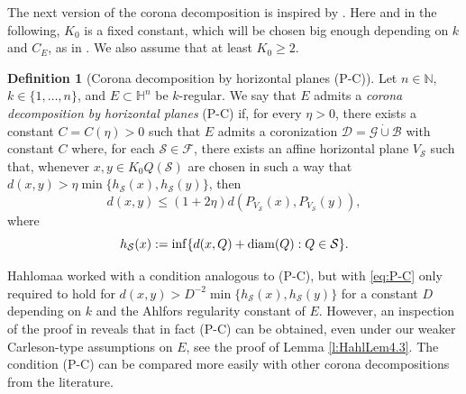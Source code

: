 \documentclass[12pt]{amsart}
\newcommand{\diam}{{\rm diam}}
\numberwithin{equation}{section}
\theoremstyle{plain}
\theoremstyle{definition}
\newtheorem{definition}[theorem]{Definition}
\theoremstyle{remark}
\begin{document}
The next version of the corona decomposition is inspired by \cite[Lemma 4.3]{Hahlomaa}. 
Here and in the following, $K_0$ is a fixed constant, which will be chosen big enough depending on $k$ and $C_E$, as in \cite[p.4]{Hahlomaa}. We also assume that at least $K_0\geq 2$.

\begin{definition}[Corona decomposition by horizontal planes (P-C)%
]\label{d:P-C}
Let $n\in \mathbb{N}$, $k\in \{1,\ldots,n\}$, and $E\subset \mathbb{H}^n$ be $k$-regular.  
We say that $E$ admits a \textit{corona decomposition  by horizontal planes} (P-C)  if, for every $\eta>0$, there exists a constant $C=C(\eta)>0$ such that $E$ admits a coronization $\mathcal{D}=\mathcal{G}\dot{\cup}\mathcal{B}$ with constant $C$  
where,  for each $\mathcal S\in\mathcal F$,
there exists an affine horizontal plane $V_\mathcal S$ such that, whenever $x,y\in K_0 Q(\mathcal S)$ are chosen in such a way that $d(x,y)>\eta\min\{h_\mathcal S(x),h_\mathcal S(y)\}$, then 
\begin{equation}\label{eq:P-C}
d(x,y)\leq (1+2\eta)d(P_{V_\mathcal S}(x), P_{V_\mathcal S}(y)),\end{equation}
where 
\[h_\mathcal S(x):=\inf\{d(x,Q)+\diam(Q):Q\in\mathcal S\}.\]
\end{definition}

Hahlomaa worked with a condition analogous to (P-C), but with \eqref{eq:P-C} only required to hold for $d(x,y)>D^{-2} \min\{h_{\mathcal{S}}(x),h_{\mathcal{S}}(y)\}$ for a constant $D$ depending on $k$ and the Ahlfors regularity constant of $E$. However, an inspection of the proof in \cite{Hahlomaa} reveals that in fact (P-C) can be obtained, even under our weaker Carleson-type assumptions on $E$, see the proof of Lemma \ref{l:HahlLem4.3}. The condition (P-C) can be compared more easily with other corona decompositions from the literature.
\end{document}
